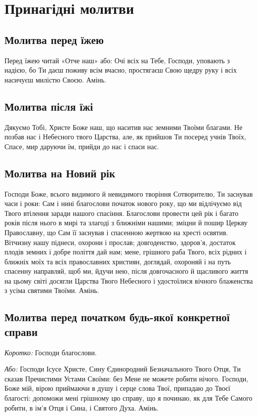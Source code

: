\documentclass[chapters.tex]{subfiles}
\begin{document}
\chapter{Принагідні молитви}
\section{Молитва перед їжею}
Перед їжею читай «Отче наш» або: Очі всіх на Тебе, Господи, уповають з надією, бо Ти даєш поживу всім вчасно, простягаєш Свою щедру руку і всіх насичуєш милістю Своєю. Амінь.

\section{Молитва після їжі}
Дякуємо Тобі, Христе Боже наш, що наситив нас земними Твоїми благами. Не позбав нас і Небесного твого Царства, але, як прийшов Ти посеред учнів Твоїх, Спасе, мир даруючи їм, прийди до нас і спаси нас.

\section{Молитва на Новий рік}
Господи Боже, всього видимого й невидимого творіння Сотворителю, Ти заснував часи і роки: Сам і нині благослови початок нового року, що ми відлічуємо від Твого втілення заради нашого спасіння. Благослови провести цей рік і багато років після нього в мирі та злагоді з ближніми нашими; зміцни й пошир Церкву Православну, що Сам її заснував і спасенною жертвою на хресті освятив. Вітчизну нашу піднеси, охорони і прослав; довгоденство, здоров’я, достаток плодів земних і добре поліття дай нам; мене, грішного раба Твого, всіх рідних і ближніх моїх та всіх православних християн, доглядай, охороняй і на путь спасенну направляй, щоб ми, йдучи нею, після довгочасного й щасливого життя на цьому світі досягли Царства Твого Небесного і удостоїлися вічного блаженства з усіма святими Твоїми. Амінь.

\section{Молитва перед початком будь-якої конкретної справи}
\emph{Коротко:} Господи благослови.

\emph{Або:} Господи Ісусе Христе, Сину Єдинородний Безначального Твого Отця, Ти сказав Пречистими Устами Своїми: без Мене не можете робити нічого. Господи, Боже мій, вірою приймаючи в душу і серце слова Твої, припадаю до Твоєї благості: допоможи мені грішному цю справу, що я починаю, як для Тебе Самого робити, в ім’я Отця і Сина, і Святого Духа. Амінь.
\end{document}
